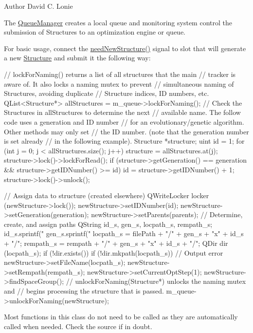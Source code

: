 \begin{DoxyAuthor}{Author}
David C. Lonie
\end{DoxyAuthor}
The \hyperlink{classGlobalSearch_1_1QueueManager}{Queue\-Manager} creates a local queue and monitoring system control the submission of Structures to an optimization engine or queue.

For basic usage, connect the \hyperlink{classGlobalSearch_1_1QueueManager_a4b50dbd51e53b1d0d5cb93e9d7380c1c}{need\-New\-Structure()} signal to slot that will generate a new \hyperlink{classGlobalSearch_1_1Structure}{Structure} and submit it the following way\-: \begin{DoxyVerb}// lockForNaming() returns a list of all structures that the main
// tracker is aware of. It also locks a naming mutex to prevent
// simultaneous naming of Structures, avoiding duplicate
// Structure indices, ID numbers, etc.
QList<Structure*> allStructures = m_queue->lockForNaming();
// Check the Structures in allStructures to determine the next
// available name. The follow code uses a generation and ID number
// for an evolutionary/genetic algorithm. Other methods may only set
// the ID number. (note that the generation number is set already
// in the following example).
Structure *structure;
uint id = 1;
for (int j = 0; j < allStructures.size(); j++) {
  structure = allStructures.at(j);
  structure->lock()->lockForRead();
  if (structure->getGeneration() == generation &&
      structure->getIDNumber() >= id) {
    id = structure->getIDNumber() + 1;
  }
  structure->lock()->unlock();
}

// Assign data to structure (created elsewhere)
QWriteLocker locker (newStructure->lock());
newStructure->setIDNumber(id);
newStructure->setGeneration(generation);
newStructure->setParents(parents);
// Determine, create, and assign paths
QString id_s, gen_s, locpath_s, rempath_s;
id_s.sprintf("%
gen_s.sprintf("%
locpath_s = filePath + "/" + gen_s + "x" + id_s + "/";
rempath_s = rempath + "/" + gen_s + "x" + id_s + "/";
QDir dir (locpath_s);
if (!dir.exists()) {
  if (!dir.mkpath(locpath_s)) {
    // Output error
  }
}
newStructure->setFileName(locpath_s);
newStructure->setRempath(rempath_s);
newStructure->setCurrentOptStep(1);
newStructure->findSpaceGroup();
// unlockForNaming(Structure*) unlocks the naming mutex and
// begins processing the structure that is passed.
m_queue->unlockForNaming(newStructure);
\end{DoxyVerb}
 \begin{DoxyVerb} Most functions in this class do not need to be called as they are
 automatically called when needed. Check the source if in doubt.\end{DoxyVerb}
 

